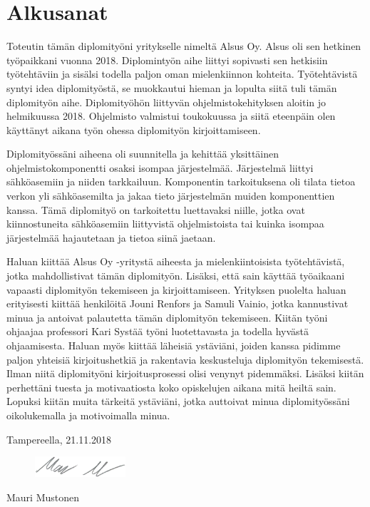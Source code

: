 \chapter*{Alkusanat}
\label{ch:alkusanat}
Toteutin tämän diplomityöni yritykselle nimeltä Alsus Oy. Alsus oli sen hetkinen työpaikkani vuonna 2018. Diplomintyön aihe liittyi sopivasti sen hetkisiin työtehtäviin ja sisälsi todella paljon oman mielenkiinnon kohteita. Työtehtävistä syntyi idea diplomityöstä, se muokkautui hieman ja lopulta siitä tuli tämän diplomityön aihe. Diplomityöhön liittyvän ohjelmistokehityksen aloitin jo helmikuussa 2018. Ohjelmisto valmistui toukokuussa ja siitä eteenpäin olen käyttänyt aikana työn ohessa diplomityön kirjoittamiseen.

Diplomityössäni aiheena oli suunnitella ja kehittää yksittäinen ohjelmistokomponentti osaksi isompaa järjestelmää. Järjestelmä liittyi sähköasemiin ja niiden tarkkailuun. Komponentin tarkoituksena oli tilata tietoa verkon yli sähköasemilta ja jakaa tieto järjestelmän muiden komponenttien kanssa. Tämä diplomityö on tarkoitettu luettavaksi niille, jotka ovat kiinnostuneita sähköasemiin liittyvistä ohjelmistoista tai kuinka isompaa järjestelmää hajautetaan ja tietoa siinä jaetaan.

Haluan kiittää Alsus Oy -yritystä aiheesta ja mielenkiintoisista työtehtävistä, jotka mahdollistivat tämän diplomityön. Lisäksi, että sain käyttää työaikaani vapaasti diplomityön tekemiseen ja kirjoittamiseen. Yrityksen puolelta haluan erityisesti kiittää henkilöitä Jouni Renfors ja Samuli Vainio, jotka kannustivat minua ja antoivat palautetta tämän diplomityön tekemiseen. Kiitän työni ohjaajaa professori Kari Systää työni luotettavasta ja todella hyvästä ohjaamisesta. Haluan myös kiittää läheisiä ystäviäni, joiden kanssa pidimme paljon yhteisiä kirjoitushetkiä ja rakentavia keskusteluja diplomityön tekemisestä. Ilman niitä diplomityöni kirjoitusprosessi olisi venynyt pidemmäksi. Lisäksi kiitän perhettäni tuesta ja motivaatiosta koko opiskelujen aikana mitä heiltä sain. Lopuksi kiitän muita tärkeitä ystäviäni, jotka auttoivat minua diplomityössäni oikolukemalla ja motivoimalla minua.

\vspace{2\baselineskip}

Tampereella, 21.11.2018

\begin{figure}[ht!]
	\includegraphics[width=0.3\textwidth,left]{pictures/signature.png}
\end{figure}

Mauri Mustonen